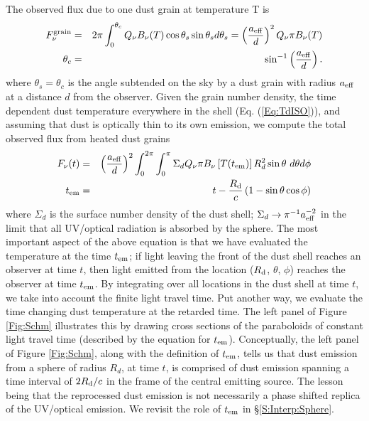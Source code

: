 The observed flux due to one dust grain at temperature T is
\begin{eqnarray}
F^{\rm{grain}}_{\nu} &=& 2 \pi \int^{\theta_c}_0{ Q_{\nu} B_{\nu}(T) \cos{\theta_s} \sin{\theta_s} d \theta_s} = \left(\frac{ a_{\rm{eff}} }{d}\right)^2 Q_{\nu} \pi B_{\nu}(T) \\ \nonumber  
\theta_c &=& \sin^{-1}\left( \frac{ a_{\rm{eff}}}{d}\right) .
\end{eqnarray}
where $\theta_s = \theta_c$ is the angle subtended on the sky by a dust grain
with radius $ a_{\rm{eff}}$ at a distance $d$ from the observer. Given the
grain number density, the time dependent dust temperature everywhere in the
shell (Eq. (\ref{Eq:TdISO})), and assuming that dust is
optically thin to its own emission, we compute the total observed flux from
heated dust grains
\begin{eqnarray}
\label{Eq:FnuSS}
 F_{\nu}(t) &=& \left(\frac{ a_{\rm{eff}} }{d}\right)^2 \int^{2 \pi}_{0}{\int^{\pi}_{0}{ \Sigma_d Q_{\nu}  \pi B_{\nu}\left[T(t_{\em})\right]  R^2_d \sin{\theta} \ d \theta d\phi }}   \\ \nonumber 
t_{\em}& =& t - \frac{\Rin}{c} \left( 1 - \sin{\theta} \cos{\phi}\right)  
\end{eqnarray}
where $\Sigma_d$ is the surface number density of the dust shell; $\Sigma_d
\rightarrow \pi^{-1} a^{-2}_{\eff}$ in the limit that all UV/optical radiation
is absorbed by the sphere. The most important aspect of the above equation is
that we have evaluated the temperature at the time $t_{\em}$; if light leaving
the front of the dust shell reaches an observer at time $t$, then light
emitted from the location ($\Rin$, $\theta$, $\phi$) reaches the observer at
time $t_{\em}$. By integrating over all locations in the dust shell at time
$t$, we take into account the finite light travel time. Put another way, we
evaluate the time changing dust temperature at the retarded time. The left
panel of Figure \ref{Fig:Schm} illustrates this by drawing cross sections of
the paraboloids of constant light travel time (described by the equation for
$t_{\em}$). Conceptually, the left panel of Figure \ref{Fig:Schm}, along with
the definition of $t_{\em}$, tells us that dust emission from a sphere of
radius $R_d$, at time $t$, is comprised of dust emission spanning a time
interval of $2 \Rin /c$ in the frame of the central emitting source. The
lesson being that the reprocessed dust emission is not necessarily a phase
shifted replica of the UV/optical emission. We revisit the role of $t_{\em}$
in \S \ref{S:Interp:Sphere}.


